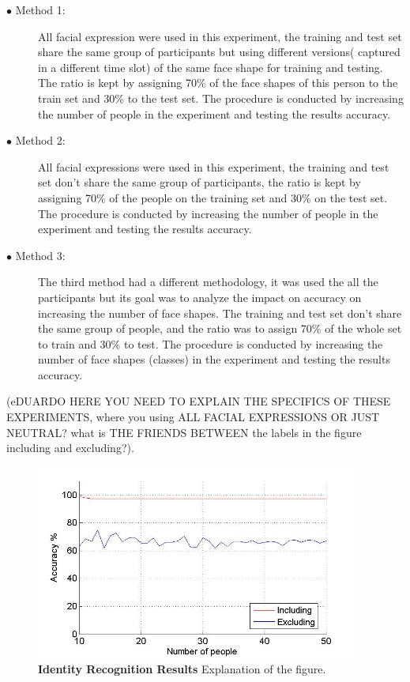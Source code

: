 \documentclass[]{article}
\begin{document}
\begin{description}
\item[$\bullet$ Method 1:] All facial expression were used in this experiment,
the training and test set share the same group of participants but using
different  versions( captured in a different time slot) of the same face shape
for training and testing. The ratio is kept by assigning 70\% of the face shapes
of this person to the train set and 30\% to the test set. The procedure is conducted
by increasing the number of people in the experiment and testing the results
accuracy.

\item[$\bullet$ Method 2:] All facial expressions were used in this experiment,
the training and test set don't  share the same group of participants, the ratio
is kept by assigning 70\% of the people on the training set and 30\% on the
test set. The procedure is conducted by increasing the number of people in the
experiment and testing the results accuracy.
\item[]
\item[$\bullet$ Method 3:] The third method had a different methodology, it was
used the all the participants but its goal was to analyze the impact on accuracy
on increasing the number of face shapes.  The training and test set don't share 
the same group of people, and the ratio was to assign 70\% of the whole set to
train and 30\% to test. The procedure is conducted by increasing the number of
face shapes (classes) in the experiment and testing the results accuracy.
\end{description}

 (eDUARDO HERE YOU NEED TO EXPLAIN THE SPECIFICS OF THESE EXPERIMENTS, where you using ALL
FACIAL EXPRESSIONS OR JUST NEUTRAL? what is THE FRIENDS BETWEEN the labels in the figure including and excluding?).

\begin{figure}[ht]
\begin{center}
\vspace{-3mm}
\includegraphics[width=0.95\textwidth]{figures/figureRecognizeFacialExpression5.jpg}
\end{center}
\caption{\textbf{Identity Recognition Results} Explanation of the figure.}
\label{identityRecognition}
\end{figure}
\end{document}
